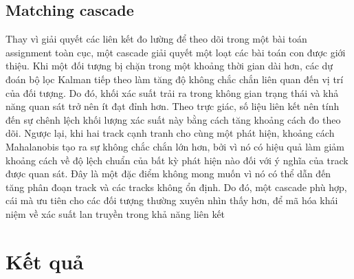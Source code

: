 \subsection{Matching cascade}
Thay vì giải quyết các liên kết đo lường để theo dõi trong một bài toán assignment toàn cục, một cascade giải quyết một loạt các bài toán con được giới thiệu. Khi một đối tượng bị chặn trong một khoảng thời gian dài hơn, các dự đoán bộ lọc Kalman tiếp theo làm tăng độ không chắc chắn liên quan đến vị trí của đối tượng. Do đó, khối xác suất trải ra trong không gian trạng thái và khả năng quan sát trở nên ít đạt đỉnh hơn. Theo trực giác, số liệu liên kết nên tính đến sự chênh lệch khối lượng xác suất này bằng cách tăng khoảng cách đo theo dõi. 
Ngược lại, khi hai track cạnh tranh cho cùng một phát hiện, khoảng cách Mahalanobis tạo ra sự không chắc chắn lớn hơn, bởi vì nó có hiệu quả làm giảm khoảng cách về độ lệch chuẩn của bất kỳ phát hiện nào đối với ý nghĩa của track được quan sát. Đây là một đặc điểm không mong muốn vì nó có thể dẫn đến tăng phân đoạn track và các tracks không ổn định. Do đó, một cascade phù hợp, cái mà ưu tiên cho các đối tượng thường xuyên nhìn thấy hơn, để mã hóa khái niệm về xác suất lan truyền trong khả năng liên kết

\section{Kết quả}

